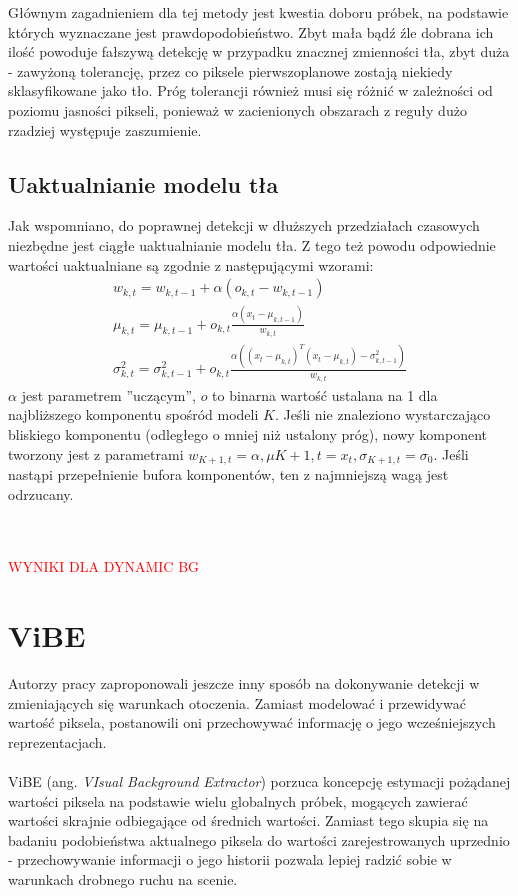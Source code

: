Głównym zagadnieniem dla tej metody jest kwestia doboru próbek, na podstawie których wyznaczane jest prawdopodobieństwo. Zbyt mała bądź źle dobrana ich ilość powoduje fałszywą detekcję w przypadku znacznej zmienności tła, zbyt duża - zawyżoną tolerancję, przez co piksele pierwszoplanowe zostają niekiedy sklasyfikowane jako tło. Próg tolerancji również musi się różnić w zależności od poziomu jasności pikseli, ponieważ w zacienionych obszarach z reguły dużo rzadziej występuje zaszumienie.
\subsection{Uaktualnianie modelu tła}
Jak wspomniano, do poprawnej detekcji w dłuższych przedziałach czasowych niezbędne jest ciągłe uaktualnianie modelu tła. Z tego też powodu odpowiednie wartości uaktualniane są zgodnie z następującymi wzorami:
\begin{gather}
w_{k,t} = w_{k,t-1}+\alpha(o_{k,t}-w_{k,t-1}) \\
\mu_{k,t} = \mu_{k,t-1}+o_{k,t}\frac{\alpha (x_{t}-\mu_{k,t-1})}{w_{k,t}} \\
\sigma^2_{k,t} = \sigma^2_{k,t-1}+o_{k,t}\frac{\alpha ((x_{t}-\mu_{k,t})^{T}(x_{t}-\mu_{k,t})-\sigma^2_{k,t-1})}{w_{k,t}}
\end{gather}
$\alpha$ jest parametrem ''uczącym'', $o$ to binarna wartość ustalana na 1 dla najbliższego komponentu spośród modeli $K$. Jeśli nie znaleziono wystarczająco bliskiego komponentu (odległego o mniej niż ustalony próg), nowy komponent tworzony jest z parametrami $w_{K+1,t} = \alpha, \mu{K+1,t}= x_{t}, \sigma_{K+1,t}=\sigma_{0}$. Jeśli nastąpi przepełnienie bufora komponentów, ten z najmniejszą wagą jest odrzucany. \\ \\ \\
\begin{LARGE}
\textcolor{red}{WYNIKI DLA DYNAMIC BG}
\end{LARGE}
\section{ViBE}
Autorzy pracy \cite{barnich2011vibe} zaproponowali jeszcze inny sposób na dokonywanie detekcji w zmieniających się warunkach otoczenia. Zamiast modelować i przewidywać wartość piksela, postanowili oni przechowywać informację o jego wcześniejszych reprezentacjach.
\paragraph{}
ViBE (ang. \textit{VIsual Background Extractor}) porzuca koncepcję estymacji pożądanej wartości piksela na podstawie wielu globalnych próbek, mogących zawierać wartości skrajnie odbiegające od średnich wartości. Zamiast tego skupia się na badaniu podobieństwa aktualnego piksela do wartości zarejestrowanych uprzednio - przechowywanie informacji o jego historii pozwala lepiej radzić sobie w warunkach drobnego ruchu na scenie.
